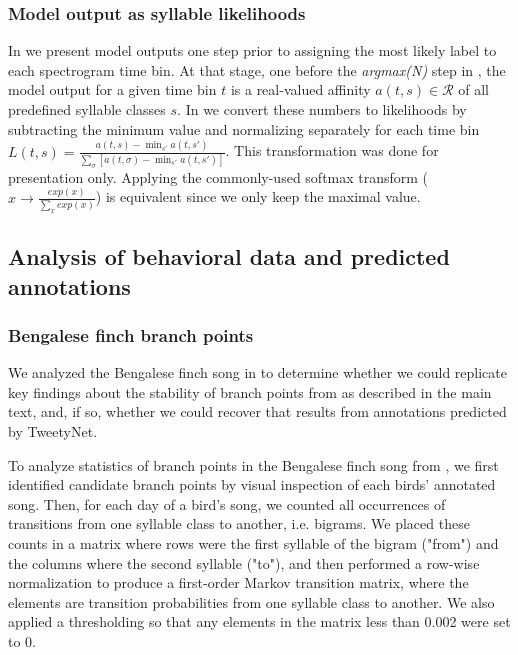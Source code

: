 \documentclass[9pt,lineno]{elife}
\begin{document}
\subsubsection{Model output as syllable likelihoods}
In  we present model outputs one step prior to assigning the most likely label to each spectrogram time bin. At that stage, one before the \textit{argmax(N)} step in , the model output for a given time bin $t$ is a real-valued affinity $a(t,s)\in\mathcal{R}$ of all predefined syllable classes $s$. In  we convert these numbers to likelihoods by subtracting the minimum value and normalizing separately for each time bin $L(t,s)=\frac{a(t,s)-\min_{s'}a(t,s')}{\sum_{\sigma}[a(t,\sigma)-\min_{s'}a(t,s')]}$. This transformation was done for presentation only. Applying the commonly-used softmax transform ($x\rightarrow\frac{exp(x)}{\sum_xexp(x)}$) is equivalent since we only keep the maximal value.

\subsection{Analysis of behavioral data and predicted annotations}
\subsubsection{Bengalese finch branch points}
We analyzed the Bengalese finch song in \cite{nicholson_bengalese_2017} 
to determine whether we could replicate key findings about the stability of branch points 
from \cite{warren_variable_2012} as described in the main text, 
and, if so, whether we could recover that results from annotations predicted by TweetyNet.

To analyze statistics of branch points in the Bengalese finch song from \cite{nicholson_bengalese_2017}, 
we first identified candidate branch points by visual inspection of each birds' annotated song.
Then, for each day of a bird's song, we counted all occurrences 
of transitions from one syllable class to another, i.e. bigrams.
We placed these counts in a matrix where rows were the first syllable 
of the bigram ("from") and the columns where the second syllable ("to"), 
and then performed a row-wise normalization 
to produce a first-order Markov transition matrix, 
where the elements are transition probabilities from one syllable class to another. 
We also applied a thresholding so that any elements in the matrix less than 0.002 were set to 0.
\end{document}
